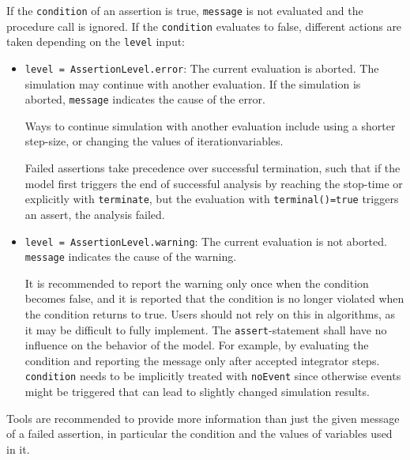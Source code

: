 If the \lstinline!condition! of an assertion is true, \lstinline!message! is not evaluated and the procedure call is ignored.
If the \lstinline!condition! evaluates to false, different actions are taken depending on the \lstinline!level! input:
\begin{itemize}
\item
  \lstinline!level = AssertionLevel.error!:
  The current evaluation is aborted.
  The simulation may continue with another evaluation.
  If the simulation is aborted, \lstinline!message! indicates the cause of the error.
  \begin{nonnormative}
  Ways to continue simulation with another evaluation include using a shorter step-size, or changing the values of iterationvariables.
  \end{nonnormative}
  Failed assertions take precedence over successful termination, such that if the model first triggers the end of successful analysis by reaching the stop-time or explicitly with \lstinline!terminate!, but the evaluation with \lstinline!terminal()=true! triggers an assert, the analysis failed.
\item
  \lstinline!level = AssertionLevel.warning!:
  The current evaluation is not aborted.
  \lstinline!message! indicates the cause of the warning.
  \begin{nonnormative}
  It is recommended to report the warning only once when the condition becomes false, and it is reported that the condition is no longer violated when the condition returns to true.
  Users should not rely on this in algorithms, as it may be difficult to fully implement.
  The \lstinline!assert!-statement shall have no influence on the behavior of the model.
  For example, by evaluating the condition and reporting the message only after accepted integrator steps.
  \lstinline!condition! needs to be implicitly treated with \lstinline!noEvent! since otherwise events might be triggered that can lead to slightly changed simulation results.
  \end{nonnormative}
\end{itemize}
Tools are recommended to provide more information than just the given message of a failed assertion, in particular the condition and the values of variables used in it.

